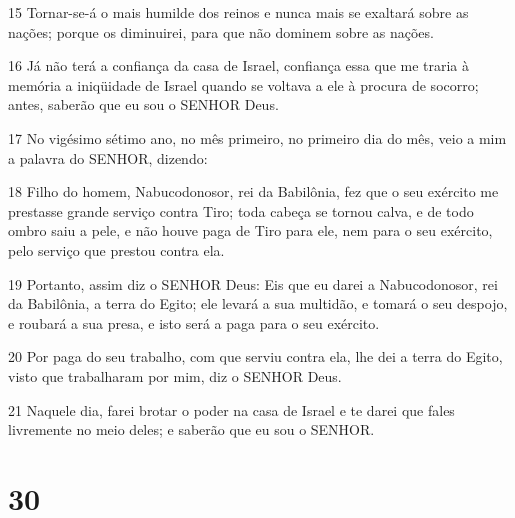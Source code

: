 \par 15 Tornar-se-á o mais humilde dos reinos e nunca mais se exaltará sobre as nações; porque os diminuirei, para que não dominem sobre as nações.
\par 16 Já não terá a confiança da casa de Israel, confiança essa que me traria à memória a iniqüidade de Israel quando se voltava a ele à procura de socorro; antes, saberão que eu sou o SENHOR Deus.
\par 17 No vigésimo sétimo ano, no mês primeiro, no primeiro dia do mês, veio a mim a palavra do SENHOR, dizendo:
\par 18 Filho do homem, Nabucodonosor, rei da Babilônia, fez que o seu exército me prestasse grande serviço contra Tiro; toda cabeça se tornou calva, e de todo ombro saiu a pele, e não houve paga de Tiro para ele, nem para o seu exército, pelo serviço que prestou contra ela.
\par 19 Portanto, assim diz o SENHOR Deus: Eis que eu darei a Nabucodonosor, rei da Babilônia, a terra do Egito; ele levará a sua multidão, e tomará o seu despojo, e roubará a sua presa, e isto será a paga para o seu exército.
\par 20 Por paga do seu trabalho, com que serviu contra ela, lhe dei a terra do Egito, visto que trabalharam por mim, diz o SENHOR Deus.
\par 21 Naquele dia, farei brotar o poder na casa de Israel e te darei que fales livremente no meio deles; e saberão que eu sou o SENHOR.

\chapter{30}

